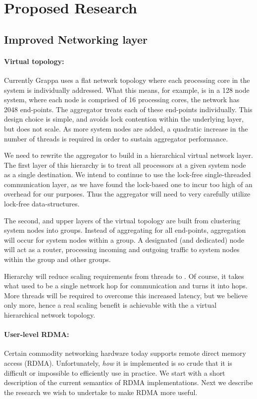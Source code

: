 \section{Proposed Research}

\subsection{Improved Networking layer}

\paragraph{Virtual topology:} Currently Grappa uses a flat network topology where each processing core in the system is individually addressed.  What this means, for example, is in a 128 node system, where each node is comprised of 16 processing cores, the network has 2048 end-points.  The aggregator treats each of these end-points individually.  This design choice is simple, and avoids lock contention within the underlying \gasnet layer, but does not scale.  As more system nodes are added, a quadratic increase in the number of threads is required in order to sustain aggregator performance.

We need to rewrite the aggregator to build in a hierarchical virtual network layer.  The first layer of this hierarchy is to treat all processors at a given system node as a single destination. We intend to continue to use the lock-free single-threaded \gasnet communication layer, as we have found the lock-based one to incur too high of an overhead for our purposes.  Thus the aggregator will need to very carefully utilize lock-free data-structures.

The second, and upper layers of the virtual topology are built from clustering system nodes into groups.  Instead of aggregating for all end-points, aggregation will occur for system nodes within a group.  A designated (and dedicated) node will act as a router, processing incoming and outgoing traffic to system nodes within the group and other groups.

Hierarchy will reduce scaling requirements from  threads to .  Of course, it takes what used to be a single network hop for communication and turns it into  hops.  More threads will be required to overcome this increased latency, but we believe only  more, hence a real scaling benefit is achievable with the a virtual hierarchical network topology.

\paragraph{User-level RDMA:} Certain commodity networking hardware today supports remote direct memory access (RDMA).  Unfortunately, \emph{how} it is implemented is so crude that it is difficult or impossible to efficiently use in practice.  We start with a short description of the current semantics of RDMA implementations.  Next we describe the research we wish to undertake to make RDMA more useful.

